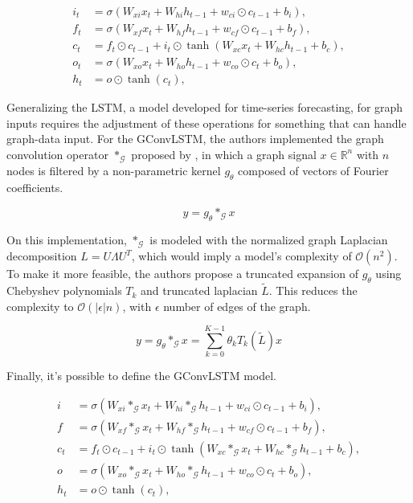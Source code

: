 $$
\begin{aligned}
i_t & =\sigma\left(\boxed{W_{x i} x_t} + \boxed{W_{h i} h_{t-1}} + w_{c i} \odot c_{t-1}+b_i\right), \\
f_t & =\sigma\left(\boxed{W_{x f} x_t} + \boxed{W_{h f} h_{t-1}} + w_{c f} \odot c_{t-1}+b_f\right), \\
c_t & =f_t \odot c_{t-1}+i_t \odot \tanh \left(\boxed{W_{x c} x_t}+\boxed{W_{h c} h_{t-1}}+b_c\right), \\
o_t & =\sigma\left(\boxed{W_{x o} x_t} + \boxed{W_{h o} h_{t-1}} + w_{c o} \odot c_t+b_o\right), \\
h_t & =o \odot \tanh \left(c_t\right),
\end{aligned}
$$

Generalizing the \gls{LSTM}, a model developed for time-series forecasting, for graph inputs requires the adjustment of these operations for something that can handle graph-data input. For the \gls{GConvLSTM}, the authors implemented the graph convolution operator $\ast_\mathcal{G}$ proposed by \cite{cnn_graph}, in which a graph signal $x \in \mathbb{R}^{n}$ with $n$ nodes is filtered by a non-parametric kernel $g_\theta$ composed of vectors of Fourier coefficients.

\begin{equation*}
y = g_\theta \ast_\mathcal{G} x
\end{equation*}

On this implementation, $\ast_\mathcal{G}$ is modeled with the normalized graph Laplacian decomposition $L=U \Lambda U^T$, which would imply a model's complexity of $\mathcal{O}(n^2)$. To make it more feasible, the authors propose a truncated expansion of $g_\theta$ using Chebyshev polynomials $T_k$ and truncated laplacian $\tilde{L}$. This reduces the complexity to $\mathcal{O}(|\epsilon|n)$, with $\epsilon$ number of edges of the graph.

\begin{equation*}
y = g_\theta \ast_\mathcal{G} x = \sum_{k=0}^{K-1}\theta_k T_k(\tilde{L})x
\end{equation*}

Finally, it's possible to define the \gls{GConvLSTM} model.

\begin{equation}
\begin{aligned}
i & =\sigma\left(W_{x i}\ast_\mathcal{G} x_t+W_{h i}\ast_\mathcal{G} h_{t-1}+w_{c i} \odot c_{t-1}+b_i\right), \\
f & =\sigma\left(W_{x f}\ast_\mathcal{G} x_t+W_{h f}\ast_\mathcal{G} h_{t-1}+w_{c f} \odot c_{t-1}+b_f\right), \\
c_t & =f_t \odot c_{t-1}+i_t \odot \tanh \left(W_{x c}\ast_\mathcal{G} x_t+W_{h c}\ast_\mathcal{G} h_{t-1}+b_c\right), \\
o & =\sigma\left(W_{x o}\ast_\mathcal{G} x_t+W_{h o} \ast_\mathcal{G}h_{t-1}+w_{c o} \odot c_t+b_o\right), \\
h_t & =o \odot \tanh \left(c_t\right),
\end{aligned}
\end{equation}

